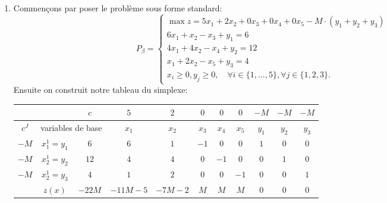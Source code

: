 \begin{td-sol}[]\ %
    \begin{enumerate}
        \item Commençons par poser le problème sous forme standard:
        \begin{equation*}
            P_\beta =
            \begin{cases}
                \max z = 5x_1 + 2x_2 + 0x_3 + 0x_4 + 0x_5 - M\cdot(y_1 + y_2 + y_3)\\
                6x_1 + x_2 - x_3 + y_1 = 6\\
                4x_1 + 4x_2 - x_4 + y_2 = 12\\
                x_1 + 2x_2 - x_5 + y_3 = 4\\
                x_i\geq 0, y_j \geq 0,\quad \forall i \in \{1,\ldots,5\}, \forall j \in \{1,2,3\}.
            \end{cases}
        \end{equation*}
        Ensuite on construit notre tableau du simplexe:
        \begin{center}
            \begin{tabular}{|ccc|cccccccc|} %
                \hline  %
                & \ &\(c\)&\(5\)&\(2\)&\(0\)&\(0\)&\(0\)&\(-M\)&\(-M\)&\(-M\)\\
                \hline %
                \multicolumn{1}{|c|}{\(c^J\)}& \multicolumn{2}{c|}{variables de base}&\(x_1\)&\(x_2\)&\(x_3\)&\(x_4\)&\(x_5\)&\(y_1\)&\(y_2\)&\(y_3\)\\
                \hline %
                \multicolumn{1}{|c|}{\(-M\)}& \multicolumn{1}{c|}{\(x_1^{1}=y_1\)} &\(6\)&\(6\)&\(1\)&\(-1\)&\(0\)&\(0\)&\(1\)&\(0\)&\(0\)\\
                \hline %
                \multicolumn{1}{|c|}{\(-M\)}& \multicolumn{1}{c|}{\(x_2^{1}=y_2\)} &\(12\)&\(4\)&\(4\)&\(0\)&\(-1\)&\(0\)&\(0\)&\(1\)&\(0\)\\
                \hline %
                \multicolumn{1}{|c|}{\(-M\)}& \multicolumn{1}{c|}{\(x_2^{1}=y_3\)} &\(4\)&\(1\)&\(2\)&\(0\)&\(0\)&\(-1\)&\(0\)&\(0\)&\(1\)\\
                \hline %
                \multicolumn{1}{|c|}{} &\(z(x)\)& \multicolumn{1}{|c|}{\(-22M\)} &\(-11M-5\)&\(-7M-2\)&\(M\)&\(M\)&\(M\)&\(0\)&\(0\)&\(0\)\\
                \hline %
            \end{tabular}
        \end{center}

\end{enumerate}
\end{td-sol}
